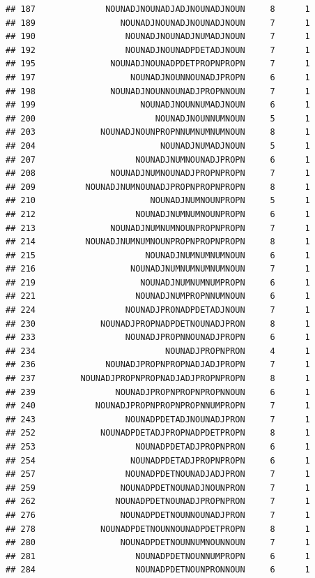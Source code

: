 \documentclass[]{article}
\begin{document}
\begin{verbatim}
## 187              NOUNADJNOUNADJADJNOUNADJNOUN     8      1
## 189                 NOUNADJNOUNADJNOUNADJNOUN     7      1
## 190                  NOUNADJNOUNADJNUMADJNOUN     7      1
## 192                  NOUNADJNOUNADPDETADJNOUN     7      1
## 195               NOUNADJNOUNADPDETPROPNPROPN     7      1
## 197                   NOUNADJNOUNNOUNADJPROPN     6      1
## 198               NOUNADJNOUNNOUNADJPROPNNOUN     7      1
## 199                     NOUNADJNOUNNUMADJNOUN     6      1
## 200                        NOUNADJNOUNNUMNOUN     5      1
## 203             NOUNADJNOUNPROPNNUMNUMNUMNOUN     8      1
## 204                         NOUNADJNUMADJNOUN     5      1
## 207                    NOUNADJNUMNOUNADJPROPN     6      1
## 208               NOUNADJNUMNOUNADJPROPNPROPN     7      1
## 209          NOUNADJNUMNOUNADJPROPNPROPNPROPN     8      1
## 210                       NOUNADJNUMNOUNPROPN     5      1
## 212                    NOUNADJNUMNUMNOUNPROPN     6      1
## 213               NOUNADJNUMNUMNOUNPROPNPROPN     7      1
## 214          NOUNADJNUMNUMNOUNPROPNPROPNPROPN     8      1
## 215                      NOUNADJNUMNUMNUMNOUN     6      1
## 216                   NOUNADJNUMNUMNUMNUMNOUN     7      1
## 219                     NOUNADJNUMNUMNUMPROPN     6      1
## 221                    NOUNADJNUMPROPNNUMNOUN     6      1
## 224                  NOUNADJPRONADPDETADJNOUN     7      1
## 230             NOUNADJPROPNADPDETNOUNADJPRON     8      1
## 233                  NOUNADJPROPNNOUNADJPROPN     6      1
## 234                          NOUNADJPROPNPRON     4      1
## 236              NOUNADJPROPNPROPNADJADJPROPN     7      1
## 237         NOUNADJPROPNPROPNADJADJPROPNPROPN     8      1
## 239                NOUNADJPROPNPROPNPROPNNOUN     6      1
## 240            NOUNADJPROPNPROPNPROPNNUMPROPN     7      1
## 243                  NOUNADPDETADJNOUNADJPRON     7      1
## 252             NOUNADPDETADJPROPNADPDETPROPN     8      1
## 253                    NOUNADPDETADJPROPNPRON     6      1
## 254                   NOUNADPDETADJPROPNPROPN     6      1
## 257                  NOUNADPDETNOUNADJADJPRON     7      1
## 259                 NOUNADPDETNOUNADJNOUNPRON     7      1
## 262                NOUNADPDETNOUNADJPROPNPRON     7      1
## 276                 NOUNADPDETNOUNNOUNADJPRON     7      1
## 278             NOUNADPDETNOUNNOUNADPDETPROPN     8      1
## 280                 NOUNADPDETNOUNNUMNOUNNOUN     7      1
## 281                    NOUNADPDETNOUNNUMPROPN     6      1
## 284                    NOUNADPDETNOUNPRONNOUN     6      1

\end{verbatim}
\end{document}

